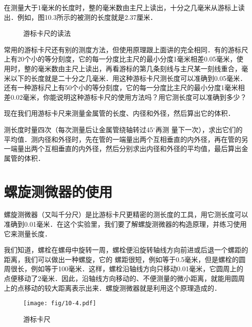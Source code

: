 在测量大于1毫米的长度时，整的毫米数由主尺上读出，十分之几毫米从游标上读出．例如，图10.3所示的被测的长度就是2.37厘米．	
	
\begin{figure}[htp]\centering
    \caption{游标卡尺的读法}
\end{figure}	
	
常用的游标卡尺还有别的测度方法，但使用原理跟上面讲的完全相同．有的游标尺上有20个小的等分刻度，它的每一分度比主尺的最小分度1毫米相差0.05毫米，使用时，整的毫米数由主尺上读出，再看游标的第几条刻线与主尺某一刻线重合，毫米以下的长度就是二十分之几毫米．用这种游标卡尺测长度可以准确到0.05毫米．还有一种游标尺上有50个小的等分刻度，它的每一分度比主尺的最小分度1毫米相差0.02毫米，你能说明这种游标卡尺的使用方法吗？用它测长度可以准确到多少？

现在我们用游标卡尺来测量金属管的长度、内径和外径，然后算出它的体积．

测长度时量四次（每次测量后让金属管绕轴转过45$^\circ$再测
量下一次），求出它们的平均值．测内径和外径时，先在管的一端量出两个互相垂直的内外径，再在管的另一端量出两个互相垂直的内外径，然后分别求出内径和外径的平均值，最后算出金属管的体积．

\section{螺旋测微器的使用}
螺旋测微器（又叫千分尺）是比游标卡尺更精密的测长度的工具，用它测长度可以准确到0.01毫米．在这个实验里，我们要了解螺旋测微器的构造原理，并练习使用它来测量长度．

我们知道，螺栓在螺母中旋转一周，螺栓便沿旋转轴线方向前进或后退一个螺距的距离，我们可以做出一种螺旋，它的	
螺距很短，例如等于0.5毫米，但是螺栓的圆周很长，例如等于100毫米．这样，螺栓沿轴线方向只移动0.01毫米，它圆周上的点便移动了2毫米．因此，沿轴线方向移动的、不便测量的微小距离，就能用圆周上的点移动的较大距离表示出来．螺旋测微器就是利用这个原理造成的．
\begin{figure}[htp]
    \centering
    \texttt{[image: fig/10-4.pdf]}
    \caption{游标卡尺}
\end{figure}

